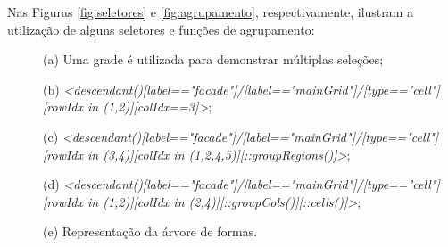 \vspace{0.3cm}

Nas Figuras \ref{fig:seletores} e \ref{fig:agrupamento}, respectivamente,  ilustram a utilização de alguns seletores e funções de agrupamento:

\vspace{0.3cm}

\begin{description}
    \item[] \; (a) Uma grade é utilizada para demonstrar múltiplas seleções;
    \item[] \; (b) \textit{<descendant()[label=="facade"]/[label=="mainGrid"]/[type=="cell"]} \\
    \qquad \qquad \qquad \textit{[rowIdx in (1,2)][colIdx==3]>};
    \item[] \; (c) \textit{<descendant()[label=="facade"]/[label=="mainGrid"]/[type=="cell"]} \\
    \qquad \qquad \qquad \textit{[rowIdx in (3,4)][colIdx in (1,2,4,5)][::groupRegions()]>};
    \item[] \; (d) \textit{<descendant()[label=="facade"]/[label=="mainGrid"]/[type=="cell"]} \\
    \qquad \qquad \qquad \textit{[rowIdx in (1,2)][colIdx in (2,4)][::groupCols()][::cells()]>};
    \item[] \; (e) Representação da árvore de formas.
\end{description}

\vspace{0.3cm}

\begin{figure}[h!]
	\centering
	\captionsetup{width=15cm}
	{}	
\end{figure}

\begin{figure}[h!]
	\centering
	\captionsetup{width=15cm}
	{}	
\end{figure}

